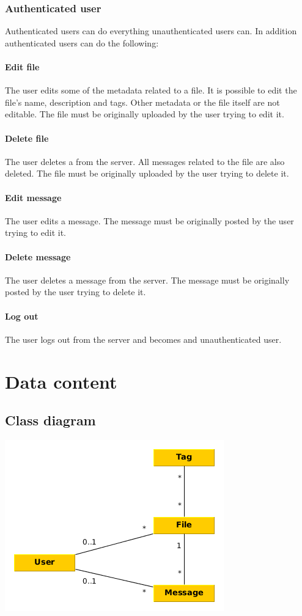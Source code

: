 \documentclass[10pt,a4paper]{article}
\begin{document}
\subsubsection{Authenticated user}
Authenticated users can do everything unauthenticated users can. In addition authenticated users can do the following:
\paragraph{Edit file}
The user edits some of the metadata related to a file. It is possible to edit the file's name, description and tags. Other metadata or the file itself are not editable. The file must be originally uploaded by the user trying to edit it.
\paragraph{Delete file}
The user deletes a from the server. All messages related to the file are also deleted. The file must be originally uploaded by the user trying to delete it.

\paragraph{Edit message}
The user edits a message. The message must be originally posted by the user trying to edit it.
\paragraph{Delete message}
The user deletes a message from the server. The message must be originally posted by the user trying to delete it.

\paragraph{Log out}
The user logs out from the server and becomes and unauthenticated user.

\section{Data content}
\subsection{Class diagram}
\includegraphics[scale=0.7]{diagrams/class.png}
\end{document}
